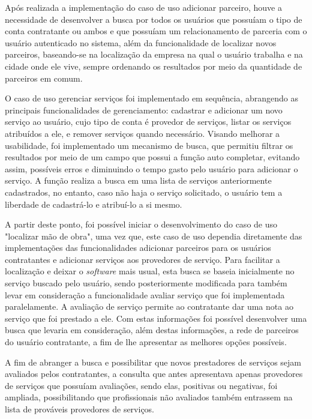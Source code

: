 \par Após realizada a implementação do caso de uso adicionar parceiro, houve a necessidade de desenvolver a busca por todos os usuários que possuíam o tipo de conta contratante ou ambos e que possuíam um relacionamento de parceria com o usuário autenticado no sistema, além da funcionalidade de localizar novos parceiros, baseando-se na localização da empresa na qual o usuário trabalha e na cidade onde ele vive, sempre ordenando os resultados por meio da quantidade de parceiros em comum. 

\par O caso de uso gerenciar serviços foi implementado em sequência, abrangendo as principais funcionalidades de gerenciamento: cadastrar e adicionar um novo serviço ao usuário, cujo tipo de conta é provedor de serviços, listar os serviços atribuídos a ele, e remover serviços quando necessário. Visando melhorar a usabilidade, foi implementado um mecanismo de busca, que permitiu filtrar os resultados por meio de um campo que possui a função  auto completar, evitando assim, possíveis erros e diminuindo o tempo gasto pelo usuário para adicionar o serviço. A função realiza a busca em uma lista de serviços anteriormente cadastrados, no entanto, caso não haja o serviço solicitado, o usuário tem a liberdade de cadastrá-lo e atribuí-lo a si mesmo.

\par A partir deste ponto, foi possível iniciar o desenvolvimento do caso de uso "localizar mão de obra", uma vez que, este caso de uso dependia diretamente das implementações das funcionalidades adicionar parceiros para os usuários contratantes e adicionar serviços aos provedores de serviço. Para facilitar a localização e deixar o \textit{software} mais usual, esta busca se baseia inicialmente no serviço buscado pelo usuário, sendo posteriormente modificada para também levar em consideração a funcionalidade avaliar serviço que foi implementada paralelamente. A avaliação de serviço permite ao contratante dar uma nota ao serviço que foi prestado a ele. Com estas informações foi possível desenvolver uma busca que levaria em consideração, além destas informações, a rede de parceiros do usuário contratante, a fim de lhe apresentar as melhores opções possíveis.

\par A fim de abranger a busca e possibilitar que novos prestadores de serviços sejam avaliados pelos contratantes, a consulta que antes apresentava apenas provedores de serviços que possuíam avaliações, sendo elas, positivas ou negativas, foi ampliada, possibilitando que profissionais não avaliados também entrassem na lista de prováveis provedores de serviços.

